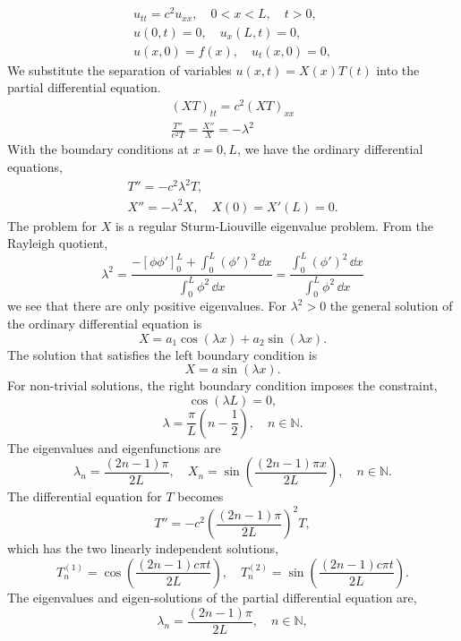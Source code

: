 {%
\begin{Solution}
  \label{solution wave fixed free end zero}
  \begin{gather*}
    u_{t t} = c^2 u_{x x}, \quad 0 < x < L, \quad t > 0, \\
    u(0,t) = 0, \quad u_x(L,t) = 0, \\
    u(x,0) = f(x), \quad u_t(x,0) = 0,
  \end{gather*}
  We substitute the separation of variables $u(x,t) = X(x) T(t)$ into the
  partial differential equation.
  \begin{gather*}
    (X T)_{t t} = c^2 (X T)_{x x} \\
    \frac{T''}{c^2 T} = \frac{X''}{X} = -\lambda^2
  \end{gather*}
  With the boundary conditions at $x = 0, L$, we have the ordinary differential
  equations,
  \begin{gather*}
    T'' = - c^2 \lambda^2 T, \\
    X'' = - \lambda^2 X, \quad X(0) = X'(L) = 0.
  \end{gather*}
  The problem for $X$ is a regular Sturm-Liouville eigenvalue problem.  
  From the Rayleigh quotient,
  \[
  \lambda^2 = \frac{ - \left[ \phi \phi' \right]_0^L + \int_0^L (\phi')^2 \,\dd x}
  { \int_0^L \phi^2 \,\dd x }
  = \frac{ \int_0^L (\phi')^2 \,\dd x}{ \int_0^L \phi^2 \,\dd x }
  \]
  we see that there are only positive eigenvalues.
  For $\lambda^2 > 0$ the general solution of the ordinary differential 
  equation is
  \[
  X = a_1 \cos( \lambda x) + a_2 \sin( \lambda x ).
  \]
  The solution that satisfies the left boundary condition is
  \[
  X = a \sin( \lambda x ).
  \]
  For non-trivial solutions, the right boundary condition imposes the 
  constraint,
  \[
  \cos \left( \lambda L \right) = 0,
  \]
  \[
  \lambda = \frac{\pi}{L} \left( n - \frac{1}{2} \right), \quad
  n \in \mathbb{N}.
  \]
  The eigenvalues and eigenfunctions are
  \[
  \lambda_n = \frac{ (2n-1) \pi }{ 2 L }, \quad
  X_n = \sin \left( \frac{ (2n-1) \pi x }{ 2 L } \right),
  \quad n \in \mathbb{N}.
  \]
  The differential equation for $T$ becomes
  \[
  T'' = - c^2 \left( \frac{ (2n-1) \pi }{ 2 L } \right)^2 T,
  \]
  which has the two linearly independent solutions,
  \[
  T_n^{(1)} = \cos \left( \frac{ (2n-1) c \pi t }{ 2 L } \right), \quad
  T_n^{(2)} = \sin \left( \frac{ (2n-1) c \pi t }{ 2 L } \right).
  \]
  The eigenvalues and eigen-solutions of the partial differential equation are,
  \[
  \lambda_n = \frac{ (2n-1) \pi }{ 2 L }, \quad n \in \mathbb{N},
\]
\end{Solution}}

